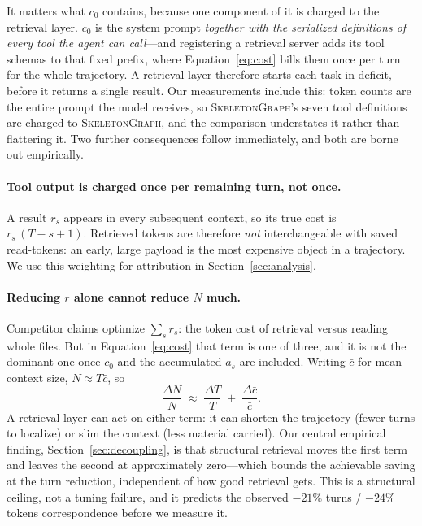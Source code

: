 \documentclass[11pt,letterpaper]{article}
\newcommand{\sg}{\textsc{SkeletonGraph}}
\begin{document}
It matters what $c_0$ contains, because one component of it is charged to the
retrieval layer. $c_0$ is the system prompt \emph{together with the serialized
definitions of every tool the agent can call}---and registering a retrieval server
adds its tool schemas to that fixed prefix, where Equation~\eqref{eq:cost} bills
them once per turn for the whole trajectory. A retrieval layer therefore starts
each task in deficit, before it returns a single result. Our measurements include
this: token counts are the entire prompt the model receives, so \sg{}'s seven tool
definitions are charged to \sg{}, and the comparison understates it rather than
flattering it. Two further consequences follow immediately, and both are borne out
empirically.

\paragraph{Tool output is charged once per remaining turn, not once.}
A result $r_s$ appears in every subsequent context, so its true cost is
$r_s\,(T-s+1)$. Retrieved tokens are therefore \emph{not} interchangeable with
saved read-tokens: an early, large payload is the most expensive object in a
trajectory. We use this weighting for attribution in Section~\ref{sec:analysis}.

\paragraph{Reducing $r$ alone cannot reduce $N$ much.}
Competitor claims optimize $\sum_s r_s$: the token cost of retrieval versus
reading whole files. But in Equation~\eqref{eq:cost} that term is one of three,
and it is not the dominant one once $c_0$ and the accumulated $a_s$ are included.
Writing $\bar{c}$ for mean context size, $N \approx T\bar{c}$, so
\begin{equation}
\frac{\Delta N}{N} \;\approx\; \frac{\Delta T}{T} \;+\; \frac{\Delta \bar{c}}{\bar{c}}.
\label{eq:decomp}
\end{equation}
A retrieval layer can act on either term: it can shorten the trajectory (fewer
turns to localize) or slim the context (less material carried). Our central
empirical finding, Section~\ref{sec:decoupling}, is that structural retrieval
moves the first term and leaves the second at approximately zero---which bounds
the achievable saving at the turn reduction, independent of how good retrieval
gets. This is a structural ceiling, not a tuning failure, and it predicts the
observed $-21\%$ turns / $-24\%$ tokens correspondence before we measure it.
\end{document}
